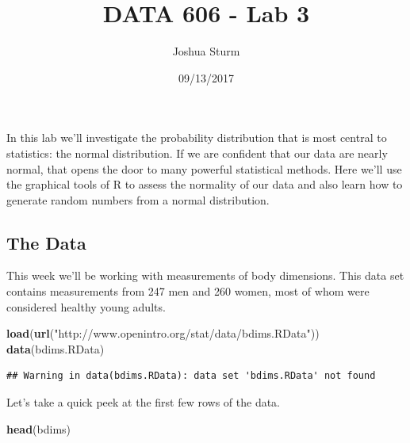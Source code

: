 \documentclass[]{article}
\title{DATA 606 - Lab 3}
\author{Joshua Sturm}
\date{09/13/2017}
\newenvironment{Shaded}{\begin{snugshade}}{\end{snugshade}}
\newcommand{\KeywordTok}[1]{\textcolor[rgb]{0.13,0.29,0.53}{\textbf{{#1}}}}
\newcommand{\StringTok}[1]{\textcolor[rgb]{0.31,0.60,0.02}{{#1}}}
\newcommand{\NormalTok}[1]{{#1}}
\begin{document}
\maketitle

In this lab we'll investigate the probability distribution that is most
central to statistics: the normal distribution. If we are confident that
our data are nearly normal, that opens the door to many powerful
statistical methods. Here we'll use the graphical tools of R to assess
the normality of our data and also learn how to generate random numbers
from a normal distribution.

\subsection{The Data}\label{the-data}

This week we'll be working with measurements of body dimensions. This
data set contains measurements from 247 men and 260 women, most of whom
were considered healthy young adults.

\begin{Shaded}
\begin{Highlighting}[]
\KeywordTok{load}\NormalTok{(}\KeywordTok{url}\NormalTok{(}\StringTok{"http://www.openintro.org/stat/data/bdims.RData"}\NormalTok{))}
\KeywordTok{data}\NormalTok{(bdims.RData)}
\end{Highlighting}
\end{Shaded}

\begin{verbatim}
## Warning in data(bdims.RData): data set 'bdims.RData' not found
\end{verbatim}

Let's take a quick peek at the first few rows of the data.

\begin{Shaded}
\begin{Highlighting}[]
\KeywordTok{head}\NormalTok{(bdims)}
\end{Highlighting}
\end{Shaded}
\end{document}
